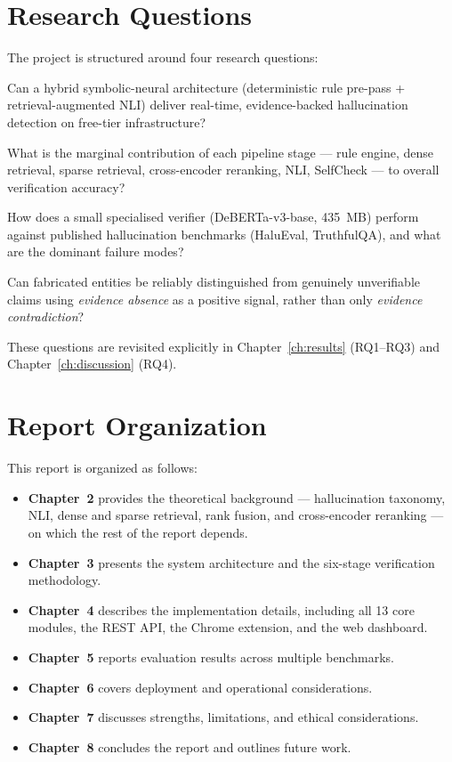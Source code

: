 \documentclass[12pt, a4paper, oneside]{report}
\newcommand{\deberta}{DeBERTa-v3}
\begin{document}
\section{Research Questions}

The project is structured around four research questions:
\begin{description}[leftmargin=2em, style=nextline]
    \item[\textbf{RQ1}] Can a hybrid symbolic-neural architecture (deterministic rule pre-pass + retrieval-augmented NLI) deliver real-time, evidence-backed hallucination detection on free-tier infrastructure?
    \item[\textbf{RQ2}] What is the marginal contribution of each pipeline stage --- rule engine, dense retrieval, sparse retrieval, cross-encoder reranking, NLI, SelfCheck --- to overall verification accuracy?
    \item[\textbf{RQ3}] How does a small specialised verifier (\deberta{}-base, 435~MB) perform against published hallucination benchmarks (HaluEval, TruthfulQA), and what are the dominant failure modes?
    \item[\textbf{RQ4}] Can fabricated entities be reliably distinguished from genuinely unverifiable claims using \emph{evidence absence} as a positive signal, rather than only \emph{evidence contradiction}?
\end{description}

These questions are revisited explicitly in Chapter~\ref{ch:results} (RQ1--RQ3) and Chapter~\ref{ch:discussion} (RQ4).

\section{Report Organization}

This report is organized as follows:
\begin{itemize}[nosep]
    \item \textbf{Chapter~2} provides the theoretical background --- hallucination taxonomy, NLI, dense and sparse retrieval, rank fusion, and cross-encoder reranking --- on which the rest of the report depends.
    \item \textbf{Chapter~3} presents the system architecture and the six-stage verification methodology.
    \item \textbf{Chapter~4} describes the implementation details, including all 13 core modules, the REST API, the Chrome extension, and the web dashboard.
    \item \textbf{Chapter~5} reports evaluation results across multiple benchmarks.
    \item \textbf{Chapter~6} covers deployment and operational considerations.
    \item \textbf{Chapter~7} discusses strengths, limitations, and ethical considerations.
    \item \textbf{Chapter~8} concludes the report and outlines future work.
\end{itemize}
\end{document}
